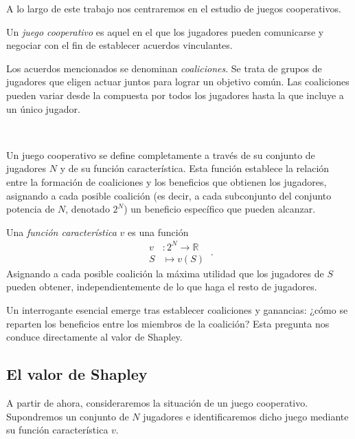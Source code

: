A lo largo de este trabajo nos centraremos en el estudio de juegos
cooperativos.

\begin{definition}
  Un \emph{juego cooperativo}  es aquel en
  el que los jugadores pueden comunicarse y negociar con el
  fin de establecer acuerdos vinculantes.
\end{definition}

Los acuerdos mencionados se denominan \emph{coaliciones}.
Se trata de grupos de jugadores que eligen actuar juntos para
lograr un objetivo común. Las coaliciones pueden
variar desde la compuesta por todos los jugadores hasta la que
incluye a un único jugador.

\

Un juego cooperativo se define completamente a través de su
conjunto de jugadores $N$ y de su función característica.
Esta función establece la relación entre la formación de
coaliciones y los beneficios que obtienen los jugadores,
asignando a cada posible coalición (es decir, a cada
subconjunto del conjunto potencia de $N$, denotado $2^N$)
un beneficio específico que pueden alcanzar.

\begin{definition}
  Una \emph{función característica} $v$ es una función
  \begin{equation*}
    \begin{split}
      v&:2^N \longrightarrow \mathbb{R}\\
      S&\longmapsto v(S)
    \end{split}\ .
  \end{equation*}
  Asignando a cada posible coalición la máxima
  utilidad que los jugadores de $S$ pueden obtener,
  independientemente de lo que haga el resto de
  jugadores.
\end{definition}

Un interrogante esencial emerge tras establecer coaliciones
y ganancias: ¿cómo se reparten los beneficios entre los
miembros de la coalición? Esta pregunta nos
conduce directamente al valor de Shapley.

\subsection{El valor de Shapley}
\label{sec:valorShapley}

A partir de ahora, consideraremos la situación de un
juego cooperativo. Supondremos un conjunto de $N$ jugadores e
identificaremos dicho juego mediante su función
característica $v$.

